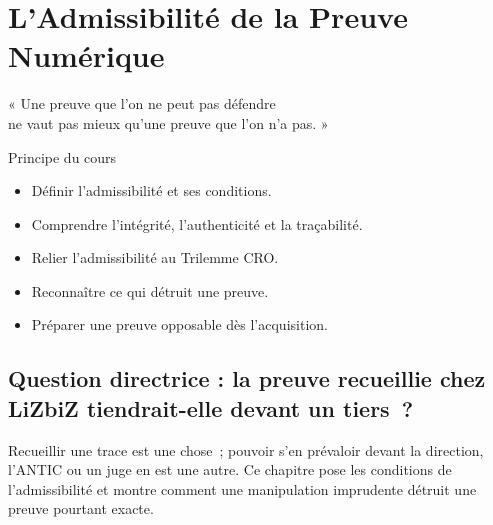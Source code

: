 
\chapter{L'Admissibilité de la Preuve Numérique}
\label{chap:preuve}

\epigraph{%
    « Une preuve que l'on ne peut pas défendre\\
    ne vaut pas mieux qu'une preuve que l'on n'a pas. »%
}{Principe du cours}


\begin{boxobjectifs}
\begin{itemize}
    \item Définir l'admissibilité et ses conditions.
    \item Comprendre l'intégrité, l'authenticité et la traçabilité.
    \item Relier l'admissibilité au Trilemme CRO.
    \item Reconnaître ce qui détruit une preuve.
    \item Préparer une preuve opposable dès l'acquisition.
\end{itemize}
\end{boxobjectifs}

\bigskip

\section*{Question directrice : la preuve recueillie chez LiZbiZ tiendrait-elle devant un tiers~?}

Recueillir une trace est une chose~; pouvoir s'en prévaloir devant la
direction, l'ANTIC ou un juge en est une autre. Ce chapitre pose les
conditions de l'admissibilité et montre comment une manipulation imprudente
détruit une preuve pourtant exacte.

